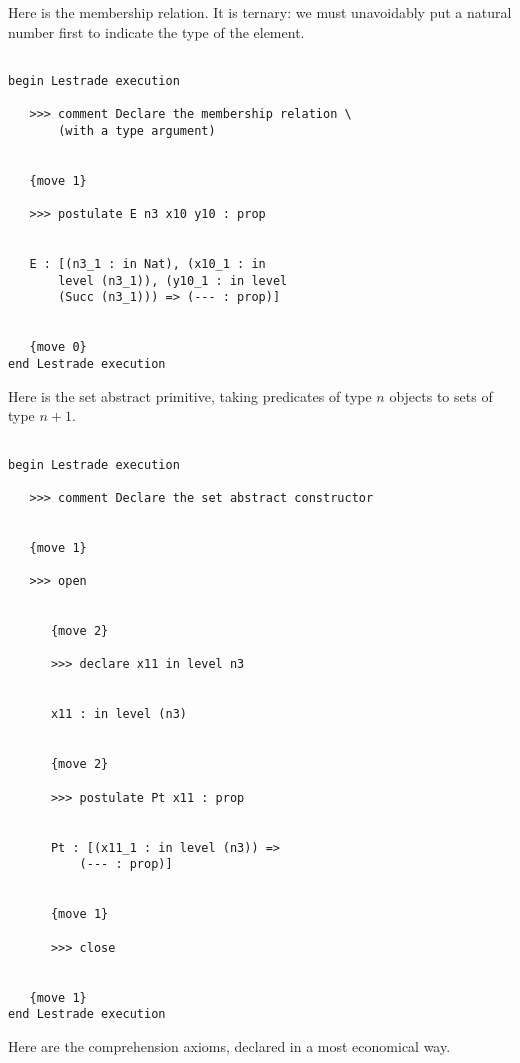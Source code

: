 \documentclass[12pt]{article}
\begin{document}
Here is the membership relation.  It is ternary:  we must unavoidably put a natural number first to indicate the type of the element.

\begin{verbatim}

begin Lestrade execution

   >>> comment Declare the membership relation \
       (with a type argument)


   {move 1}

   >>> postulate E n3 x10 y10 : prop


   E : [(n3_1 : in Nat), (x10_1 : in 
       level (n3_1)), (y10_1 : in level 
       (Succ (n3_1))) => (--- : prop)]


   {move 0}
end Lestrade execution
\end{verbatim}

Here is the set abstract primitive, taking predicates of type $n$ objects to sets of type $n+1$.

\begin{verbatim}

begin Lestrade execution

   >>> comment Declare the set abstract constructor


   {move 1}

   >>> open


      {move 2}

      >>> declare x11 in level n3


      x11 : in level (n3)


      {move 2}

      >>> postulate Pt x11 : prop


      Pt : [(x11_1 : in level (n3)) => 
          (--- : prop)]


      {move 1}

      >>> close


   {move 1}
end Lestrade execution
\end{verbatim}

Here are the comprehension axioms, declared in a most economical way.
\end{document}
